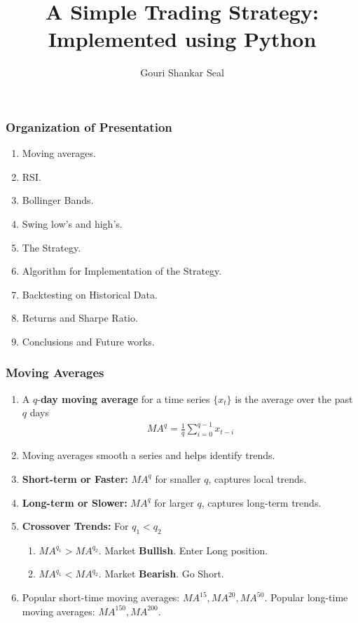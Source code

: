 \documentclass[slidestop,compress,mathserif,9pt]{beamer}
\def\be{\begin{enumerate}}
\def\ee{\end{enumerate}}
\begin{document}
\title{A Simple Trading Strategy: Implemented using Python}
\author{Gouri Shankar Seal}

\begin{frame}
\titlepage
\end{frame}



\begin{frame}
\frametitle{Organization of Presentation}
\be
\item
Moving averages.
\item
RSI.
\item
Bollinger Bands.
\item
Swing low's and high's.
\item 
The Strategy.
\item
Algorithm for Implementation of the Strategy.
\item 
Backtesting on Historical Data.
\item
Returns and Sharpe Ratio.
\item
Conclusions and Future works.

\ee

\end{frame}

\begin{frame}
\frametitle{Moving Averages}


\be

\item

A $q$-\textbf{day moving average} for a time series $\lbrace x_t \rbrace$ is the average over the past $q$ days
\begin{eqnarray*}
MA^q = \frac{1}{q} \sum_{i=0}^{q-1} x_{t-i}
\end{eqnarray*}

\item
Moving averages smooth a series and helps identify trends. 
\item
\textbf{Short-term or Faster:} $MA^q$ for smaller $q$, captures local trends.
\item
\textbf{Long-term or Slower:} $MA^q$ for larger $q$, captures long-term trends.
\item
\textbf{Crossover Trends:} For $q_1 < q_2$ 
\be
\item $MA^{q_1} > MA^{q_2}$. Market \textbf{Bullish}. Enter Long position. 
\item $MA^{q_1} < MA^{q_2}$. Market \textbf{Bearish}. Go Short.
\ee

\item
Popular short-time moving averages: $MA^{15}, MA^{20}, MA^{50}$. Popular long-time moving averages: $MA^{150}, MA^{200}$.
\ee

\end{frame}
\end{document}
